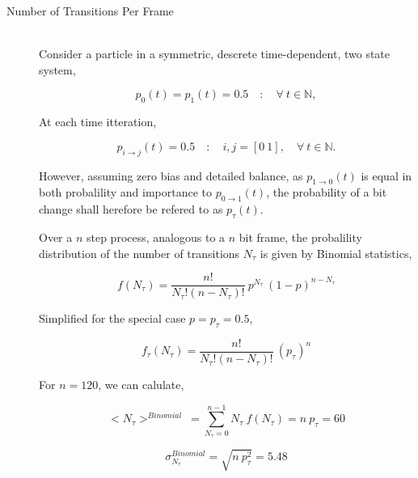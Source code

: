 			\begin{description}
				\item[Number of Transitions Per Frame] \hfill \\
					
					Consider a particle in a symmetric, descrete time-dependent, two state system,

					\begin{equation}
						p_0(t) = p_1(t) = 0.5 \quad : \quad \forall\ t \in \mathbb{N},
					\end{equation}

					At each time itteration,

					\begin{equation}
						p_{i \to j}(t) = 0.5 \quad : \quad i,j = [0\ 1], \quad \forall\ t \in \mathbb{N}.
					\end{equation}

					However, assuming zero bias and detailed balance, as $p_{1 \to 0}(t)$ is equal in both probalility and importance to $p_{0 \to 1}(t)$, the probability of a bit change shall herefore be refered to as $p_{\tau}(t)$.
					\par
					Over a $n$ step process, analogous to a $n$ bit frame, the probalility distribution of the number of transitions $N_\tau$ is given by Binomial statistics,

					\begin{equation}
						f(N_{\tau}) = \frac{n!}{N_{\tau}!(n-N_{\tau})!}\ p^{N_{\tau}}\ (1 - p)^{n-N_{\tau}}
					\end{equation}

					Simplified for the special case $p = p_{\tau} = 0.5$,

					\begin{equation}
						f_{\tau}(N_{\tau}) = \frac{n!}{N_{\tau}!(n-N_{\tau})!}\ (p_{\tau})^{n}
						\label{eqn:transition_propability_dencity}
					\end{equation}

					For $n = 120$, we can calulate,

					\begin{equation}
						<N_\tau>^{Binomial} \ = \sum_{N_{\tau}=0}^{n-1} N_{\tau}\ f(N_{\tau}) = n\ p_{\tau} = 60
						\label{eqn:tansition_expectation}
					\end{equation}

					\begin{equation}
						\sigma_{N_\tau}^{Binomial} = \sqrt{ n\ p_{\tau}^2} = 5.48
					\end{equation}


\end{description}
